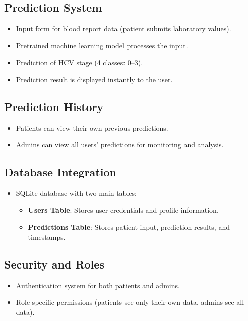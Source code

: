 \subsection*{Prediction System}
\begin{itemize}
    \item Input form for blood report data (patient submits laboratory values).
    \item Pretrained machine learning model processes the input.
    \item Prediction of HCV stage (4 classes: 0--3).
    \item Prediction result is displayed instantly to the user.
\end{itemize}

\subsection*{Prediction History}
\begin{itemize}
    \item Patients can view their own previous predictions.
    \item Admins can view all users' predictions for monitoring and analysis.
\end{itemize}

\subsection*{Database Integration}
\begin{itemize}
    \item SQLite database with two main tables:
    \begin{itemize}
        \item \textbf{Users Table}: Stores user credentials and profile information.
        \item \textbf{Predictions Table}: Stores patient input, prediction results, and timestamps.
    \end{itemize}
\end{itemize}

\subsection*{Security and Roles}
\begin{itemize}
    \item Authentication system for both patients and admins.
    \item Role-specific permissions (patients see only their own data, admins see all data).
\end{itemize}

